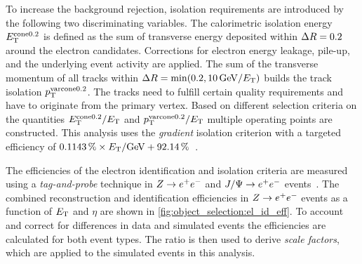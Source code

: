 To increase the background rejection, isolation requirements are introduced by the following two discriminating variables.
The calorimetric isolation energy $E_\text{T}^{\text{cone}0.2}$ is defined as the sum of transverse energy deposited within
$\Delta R = 0.2$ around the electron candidates.
Corrections for electron energy leakage, pile-up, and the underlying event activity are applied.
The sum of the transverse momentum of all tracks within $\dr = \min(0.2, \unit[10]{GeV} / \et)$ builds the
track isolation $p_\text{T}^{\text{varcone}0.2}$. The tracks need to fulfill certain quality requirements and have to originate
from the primary vertex.
Based on different selection criteria on the quantities $E_\text{T}^{\text{cone}0.2} / E_\text{T}$ and
$p_\text{T}^{\text{varcone}0.2} / E_\text{T}$ multiple operating points are constructed. This analysis uses the \emph{gradient}
isolation criterion with a targeted efficiency of
$\unit[0.1143]{\%} \times \et / \text{GeV} + \unit[92.14]{\%}$~\cite{ATLAS-CONF-2016-024}.

The efficiencies of the electron identification and isolation criteria are measured using a \emph{tag-and-probe} technique
in $Z \to e^+e^-$ and $J/\Psi \to e^+e^-$ events~\cite{ATLAS-CONF-2016-024}.
The combined reconstruction and identification efficiencies in $Z \to e^+e^-$ events as a function of $E_\text{T}$ and $\eta$
are shown in \cref{fig:object_selection:el_id_eff}.
To account and correct for differences in data and simulated events the efficiencies are calculated for both event types.
The ratio is then used to derive \emph{scale factors}, which are applied to the simulated events in this analysis.

